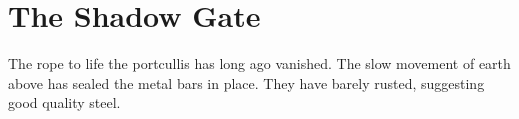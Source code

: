 \section{The Shadow Gate}


The rope to life the portcullis has long ago vanished.
The slow movement of earth above has sealed the metal bars in place.
They have barely rusted, suggesting good quality steel.




